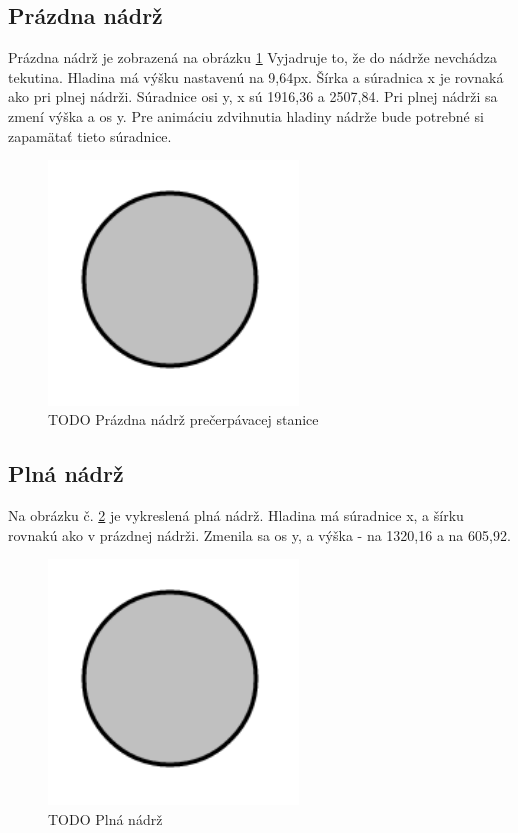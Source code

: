 \subsection{Prázdna nádrž}
Prázdna nádrž je zobrazená na obrázku \ref{picture6}
Vyjadruje to, že do nádrže nevchádza tekutina. Hladina má výšku nastavenú na 9,64px. Šírka a súradnica x je rovnaká ako pri plnej nádrži. Súradnice osi y, x sú 1916,36 a 2507,84. Pri plnej nádrži sa zmení výška a os y. Pre animáciu zdvihnutia hladiny nádrže bude potrebné si zapamätať tieto súradnice. 
\begin{figure}[H]
	\begin{center}
		\includegraphics [height=6.5cm]  {obrazky/jednoduchyKruh.png}
		\caption{TODO Prázdna nádrž prečerpávacej stanice}
		\label{picture6}
	\end{center}
\end{figure}

\subsection{Plná nádrž}
Na obrázku č. \ref{picture5} je vykreslená plná nádrž. Hladina má súradnice x, a šírku rovnakú ako v prázdnej nádrži. Zmenila sa os y, a výška - na 1320,16 a na 605,92. 

\begin{figure}[H]
	\begin{center}
		\includegraphics [height=6.5cm]  {obrazky/jednoduchyKruh.png}
		\caption{TODO Plná nádrž}
		\label{picture5}
	\end{center}
\end{figure}


